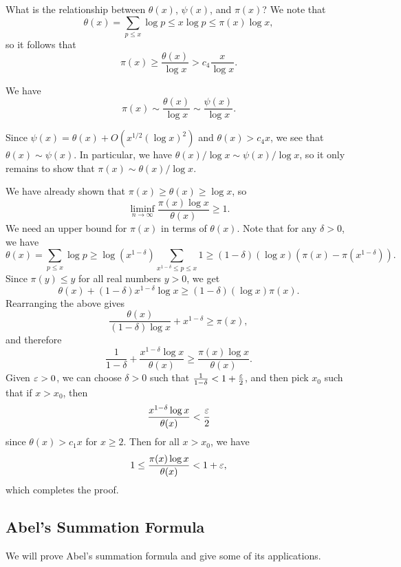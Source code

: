What is the relationship between $\theta(x)$, $\psi(x)$, and $\pi(x)$? We note that 
\[ \theta(x) = \sum_{p \leq x} \log p \leq x \log p \leq \pi(x) \log x, \]
so it follows that 
\[ \pi(x) \geq \frac{\theta(x)}{\log x} > c_4 \frac{x}{\log x}. \]

\begin{thm}\label{thm:2.7}
We have 
\[ \pi(x) \sim \frac{\theta(x)}{\log x} \sim \frac{\psi(x)}{\log x}. \]
\end{thm}
\begin{pf}
Since $\psi(x) = \theta(x) + O(x^{1/2} (\log x)^2)$ and $\theta(x) > c_4x$, we see that $\theta(x) 
\sim \psi(x)$. In particular, we have $\theta(x)/\log x \sim \psi(x)/\log x$, so it only 
remains to show that $\pi(x) \sim \theta(x)/\log x$. 

We have already shown that $\pi(x) \geq \theta(x) \geq \log x$, so 
\[ \liminf_{n\to\infty} \frac{\pi(x) \log x}{\theta(x)} \geq 1. \]
We need an upper bound for $\pi(x)$ in terms of $\theta(x)$. Note that for any $\delta > 0$, we have 
\[ \theta(x) = \sum_{p\leq x} \log p \geq \log(x^{1-\delta}) \sum_{x^{1-\delta} \leq p \leq x} 1 
\geq (1-\delta)(\log x)\left(\pi(x) - \pi(x^{1-\delta})\right). \]
Since $\pi(y) \leq y$ for all real numbers $y > 0$, we get 
\[ \theta(x) + (1-\delta)x^{1-\delta} \log x \geq (1-\delta)(\log x)\pi(x). \]
Rearranging the above gives 
\[ \frac{\theta(x)}{(1-\delta)\log x} + x^{1-\delta} \geq \pi(x), \]
and therefore 
\[ \frac{1}{1-\delta} + \frac{x^{1-\delta}\log x}{\theta(x)} \geq \frac{\pi(x)\log x}{\theta(x)}. \]
Given $\varepsilon > 0$, we can choose $\delta > 0$ such that $\frac{1}{1-\delta} < 1 + \frac{\varepsilon}2$, 
and then pick $x_0$ such that if $x > x_0$, then 
\[ \frac{x^{1-\delta}\log x}{\theta(x)} < \frac{\varepsilon}2 \] 
since $\theta(x) > c_1x$ for $x \geq 2$. Then for all $x > x_0$, we have 
\[ 1 \leq \frac{\pi(x) \log x}{\theta(x)} < 1 + \varepsilon, \]
which completes the proof.
\end{pf}

\subsection{Abel's Summation Formula}\label{subsec:2.3}
We will prove Abel's summation formula and give some of its
applications.

